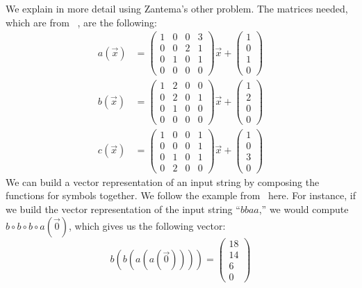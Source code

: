\par
We explain in more detail using Zantema's other problem. The matrices needed, which are from ~\cite{Hofbauer:2006:TA:1142725.1711178}, are the following:
\begin{align*}
a(\Vec{x}) &= \begin{pmatrix}
1&0&0&3\\
0&0&2&1\\
0&1&0&1\\
0&0&0&0
\end{pmatrix} \Vec{x} + \begin{pmatrix}
1\\
0\\
1\\
0
\end{pmatrix}\\
b(\Vec{x}) &= \begin{pmatrix}
1&2&0&0\\
0&2&0&1\\
0&1&0&0\\
0&0&0&0
\end{pmatrix} \Vec{x} + \begin{pmatrix}
1\\
2\\
0\\
0
\end{pmatrix}\\
c(\Vec{x}) &= \begin{pmatrix}
1&0&0&1\\
0&0&0&1\\
0&1&0&1\\
0&2&0&0
\end{pmatrix} \Vec{x} + \begin{pmatrix}
1\\
0\\
3\\
0
\end{pmatrix}
\end{align*}
We can build a vector representation of an input string by composing the functions for symbols together. We follow the example from~\cite{HeuleAaronson} here. For instance, if we build the vector representation of the input string ``$bbaa$,'' we would compute$b \circ b \circ b \circ a (\Vec{0})$, which gives us the following vector:
\[
b(b(a(a(\Vec{0}))))= \begin{pmatrix}
18\\14\\6\\0 \end{pmatrix}
\]
